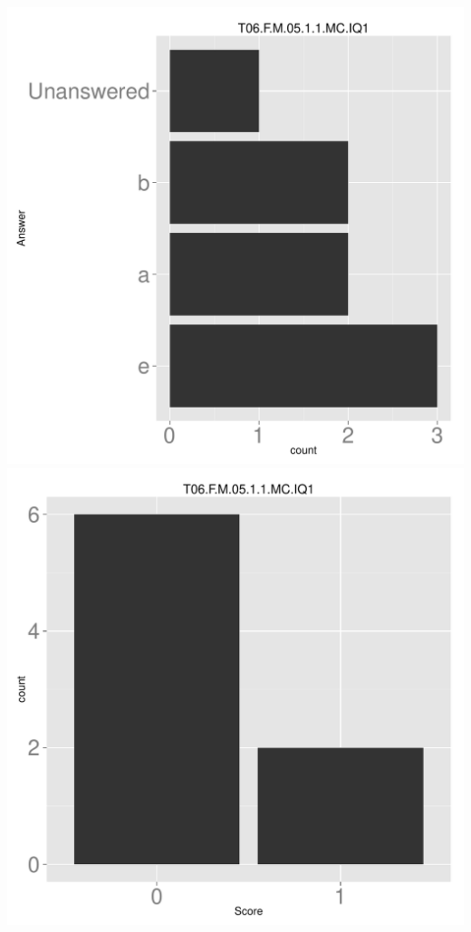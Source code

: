 \documentclass[12pt,english,nohyper]{tufte-handout}\usepackage[]{graphicx}\usepackage[]{color}
\begin{document}
\begin{center} \includegraphics[width=.45\linewidth]{Topic06_AB_47_answer} \includegraphics[width=.45\linewidth]{Topic06_AB_47_score} \end{center} 
\end{document}

